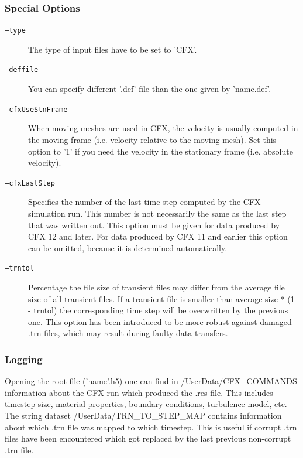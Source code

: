 \documentclass[a4paper,10pt]{article}
\begin{document}
\subsubsection{Special Options}

\begin{description}
  \item[\texttt{--type}] The type of input files have to be set to 'CFX'.

  \item[\texttt{--deffile}]  You can specify  different '.def' file than  the one
    given by 'name.def'.
  
  \item[\texttt{--cfxUseStnFrame}] When moving meshes are used in CFX, the
    velocity is usually computed in the moving frame (i.e. velocity relative to
    the moving mesh). Set this option to '1' if you need the velocity in the
    stationary frame (i.e. absolute velocity).

  \item[\texttt{--cfxLastStep}] Specifies the number of the last time step
    \underline{computed} by the CFX simulation run. This number is not
    necessarily the same as the last step that was written out. This option must
    be given for data produced by CFX 12 and later. For data produced by CFX 11
    and earlier this option can be omitted, because it is determined
    automatically.

  \item[\texttt{--trntol}] Percentage the file size of transient files may differ
    from the average file size of  all transient files. If a transient file is
    smaller than average size * (1  - trntol) the corresponding time step will
    be overwritten by the previous one.  This option has been introduced to be
    more robust  against damaged  .trn files, which  may result  during faulty
    data transfers.
\end{description}


\subsubsection{Logging}

Opening the root \hdf file ('name'.h5) one can find in /UserData/CFX\_COMMANDS
information about  the CFX  run which produced  the .res file.   This includes
timestep  size, material  properties, boundary  conditions,  turbulence model,
etc.   The string  dataset  /UserData/TRN\_TO\_STEP\_MAP contains  information
about which .trn file was mapped  to which timestep. This is useful if corrupt
.trn  files have  been encountered  which got  replaced by  the  last previous
non-corrupt .trn file.
\end{document}
